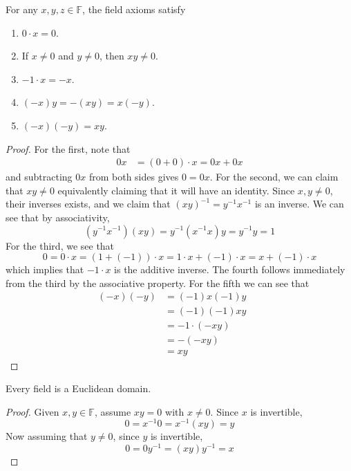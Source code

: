   \begin{lemma}
    For any $x, y, z \in \mathbb{F}$, the field axioms satisfy 
    \begin{enumerate}
      \item $0 \cdot x = 0$.
      \item If $x \neq 0$ and $y \neq 0$, then $x y \neq 0$.
      \item $-1 \cdot x = -x$. 
      \item $(-x) y = - (xy) = x (-y)$. 
      \item $(-x) (-y) = xy$. 
    \end{enumerate}
  \end{lemma} 
  \begin{proof}
    For the first, note that 
    \begin{align}
      0 x & = (0 + 0) \cdot x = 0 x + 0x 
    \end{align}
    and subtracting $0x$ from both sides gives $0 = 0x$. For the second, we can claim that $xy \neq 0$ equivalently claiming that it will have an identity. Since $x, y \neq 0$, their inverses exists, and we claim that $(xy)^{-1} = y^{-1} x^{-1}$ is an inverse. We can see that by associativity, 
    \begin{equation}
      (y^{-1} x^{-1}) (xy) = y^{-1} (x^{-1} x) y = y^{-1} y = 1
    \end{equation} 
    For the third, we see that 
    \begin{equation}
      0 = 0 \cdot x = (1 + (-1)) \cdot x = 1 \cdot x + (-1) \cdot x = x + (-1) \cdot x 
    \end{equation}
    which implies that $-1 \cdot x$ is the additive inverse. The fourth follows immediately from the third by the associative property. For the fifth we can see that 
    \begin{align}
      (-x) (-y) & = (-1) x (-1) y && \tag{property 3} \\
                & = (-1) (-1) x y && \tag{$\times$ is commutative} \\
                & = -1 \cdot (-xy) && \tag{property 3} \\
                & = -(-xy) && \tag{property 3} \\
                & = xy && \tag{addition property 4}
    \end{align}
  \end{proof}

  \begin{theorem}
    Every field is a Euclidean domain. 
  \end{theorem}
  \begin{proof}
    Given $x, y \in \mathbb{F}$, assume $x y = 0$ with $x \neq 0$. Since $x$ is invertible,
    \begin{equation}
      0 = x^{-1} 0 = x^{-1} (x y) = y
    \end{equation}
    Now assuming that $y \neq 0$, since $y$ is invertible, 
    \begin{equation}
      0 = 0 y^{-1} = (x y) y^{-1} = x
    \end{equation}
  \end{proof}

